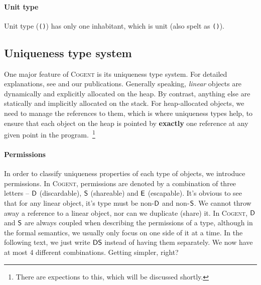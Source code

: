 \documentclass[a4paper]{article}
\newcommand{\inlinecogent}[1]{\lstinline[language=Cogent,basicstyle=\ttfamily\normalsize]{#1}\xspace}
\newcommand{\cogent}{\textsc{Cogent}\xspace}
\begin{document}
\paragraph{Unit type} Unit type (\inlinecogent{()}) has only one inhabitant, which is unit (also spelt as \inlinecogent{()}).

\subsection{Uniqueness type system}
One major feature of \cogent is its uniqueness type system. For detailed explanations, see \cite{Wadler_90} and our publications.
Generally speaking, \emph{linear} objects are dynamically and explicitly allocated on the heap. By contrast, anything else are
statically and implicitly allocated on the stack. For heap-allocated objects, we need to manage the references to them, which is
where uniqueness types help, to ensure that each object on the heap is pointed by \textbf{exactly} one reference at any
given point in the program.~\footnote{There are expections to this, which will be discussed shortly.}

\paragraph{Permissions} In order to classify uniqueness properties of each type of objects, we introduce permissions.
In \cogent, permissions are denoted by a combination of three letters -- $\mathsf{D}$ (discardable), $\mathsf{S}$ (shareable)
and $\mathsf{E}$ (escapable).
It's obvious to see that for any linear object, it's type must be non-$\mathsf{D}$ and non-$\mathsf{S}$. We cannot throw away
a reference to a linear object, nor can we duplicate (share) it. In \cogent, $\mathsf{D}$ and $\mathsf{S}$ are always coupled
when describing the permissions of a type, although in the formal semantics, we usually only focus on one side of it
at a time. In the following text, we just write $\mathsf{DS}$ instead of
having them separately. We now have at most 4 different combinations. Getting simpler, right?
\end{document}
